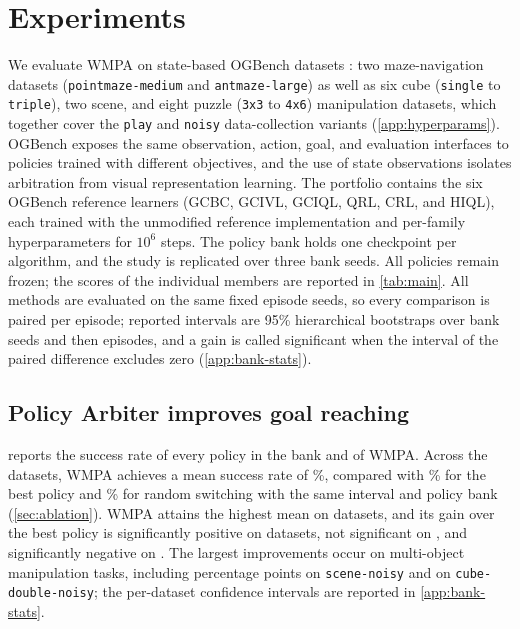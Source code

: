 \documentclass{article}
\theoremstyle{plain}
\theoremstyle{definition}
\theoremstyle{plain}
\newcommand{\wmpa}{\textsc{WMPA}}
\begin{document}
\section{Experiments}
\label{sec:setup}
We evaluate \wmpa{} on \NumEnvs{} state-based OGBench datasets \citep{park2025ogbench}: two maze-navigation datasets (\texttt{pointmaze-medium} and \texttt{antmaze-large}) as well as six cube (\texttt{single} to \texttt{triple}), two scene, and eight puzzle (\texttt{3x3} to \texttt{4x6}) manipulation datasets, which together cover the \texttt{play} and \texttt{noisy} data-collection variants (\cref{app:hyperparams}). OGBench exposes the same observation, action, goal, and evaluation interfaces to policies trained with different objectives, and the use of state observations isolates arbitration from visual representation learning. The portfolio contains the six OGBench reference learners (GCBC, GCIVL, GCIQL, QRL, CRL, and HIQL), each trained with the unmodified reference implementation and per-family hyperparameters for $10^6$ steps. The policy bank holds one checkpoint per algorithm, and the study is replicated over three bank seeds. All policies remain frozen; the scores of the individual members are reported in \cref{tab:main}. All methods are evaluated on the same fixed episode seeds, so every comparison is paired per episode; reported intervals are 95\% hierarchical bootstraps over bank seeds and then episodes, and a gain is called significant when the interval of the paired difference excludes zero (\cref{app:bank-stats}).

\subsection{Policy Arbiter improves goal reaching}
\label{sec:main_res}
 reports the success rate of every policy in the bank and of \wmpa{}.
Across the \NumEnvs{} datasets, \wmpa{} achieves a mean success rate of \MeanWMPP\%, compared with \MeanBest\% for the best policy and \MeanRandom\% for random switching with the same interval and policy bank (\cref{sec:ablation}).
\wmpa{} attains the highest mean on \NumBetterMean{} datasets, and its gain over the best policy is significantly positive on \NumSigUp{} datasets, not significant on \NumNS{}, and significantly negative on \NumSigDown{}.
The largest improvements occur on multi-object manipulation tasks, including \GainSceneNoisy{} percentage points on \texttt{scene-noisy} and \GainCubeDoubleNoisy{} on \texttt{cube-double-noisy}; the per-dataset confidence intervals are reported in \cref{app:bank-stats}.
\end{document}

